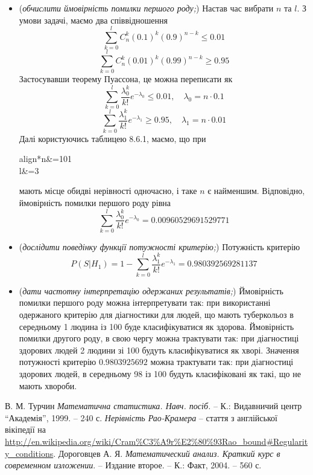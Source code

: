 \documentclass[12pt]{article} %
\begin{document}
\begin{itemize}
		\item (\textit{обчислити ймовірність помилки першого роду;})
			Настав час вибрати $n$ та $l$. З умови задачі, маємо два співвідношення
			\[\sum_{k=0}^lC_n^k(0.1)^k(0.9)^{n-k}\leq0.01\]
			\[\sum_{k=0}^lC_n^k(0.01)^k(0.99)^{n-k}\geq0.95\]
			Застосувавши теорему Пуассона, це можна переписати як
			\[\sum_{k=0}^l\frac{\lambda_0^k}{k!}e^{-\lambda_0}\leq0.01,\quad\lambda_0=n\cdot0.1\]
			\[\sum_{k=0}^l\frac{\lambda_1^k}{k!}e^{-\lambda_1}\geq0.95,\quad\lambda_1=n\cdot0.01\]
			Далі користуючись таблицею 8.6.1, маємо, що при 
			\begin{empheq}[box=\fbox]{align*}n&=101\\l&=3\end{empheq}
			мають місце обидві нерівності одночасно, і таке $n$ є найменшим. Відповідно, ймовірність помилки першого роду рівна
			\[\sum_{k=0}^l\frac{\lambda_0^k}{k!}e^{-\lambda_0}=0.00960529691529771\]
		\item (\textit{дослідити поведінку функції потужності критерію;})
			Потужність критерію
			\[P(S\big|H_1)=1-\sum_{k=0}^l\frac{\lambda_1^k}{k!}e^{-\lambda_1}=0.980392569281137\]
		\item (\textit{дати частотну інтерпретацію одержаних результатів;})
			Ймовірність помилки першого роду можна інтерпретувати так: при використанні одержаного критерію для діагностики для людей,
			що мають туберкольоз в середньому 1 людина із 100 буде класифікуватися як здорова.
			Ймовірність помилки другого роду, в свою чергу можна трактувати так: при діагностиці здорових людей
			2 людини зі 100 будуть класифікуватися як хворі. Значення
			потужності критерію $0.9803925692$ можна трактувати так: при діагностиці здорових людей, в середньому 98 із 100 будуть
			класифіковані як такі, що не мають хвороби.
	\end{itemize}
\begin{thebibliography}{9}
В. М. Турчин \emph{Математична статистика. Навч. посіб.} --
К.: Видавничий центр ``Академія'', 1999. -- 240 с.
{\em Нерівність Рао-Крамера} -- стаття з англійської вікіпедії на
\url{http://en.wikipedia.org/wiki/Cram%C3%A9r%E2%80%93Rao_bound#Regularity_conditions}.
Дороговцев А. Я. {\em Математический анализ. Краткий курс в современном изложении}. -- Издание второе. --
	К.: Факт, 2004. -- 560 с.
\end{thebibliography}
\end{document}
